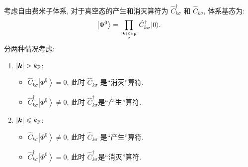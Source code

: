 \begin{example}
考虑自由费米子体系, 对于真空态的产生和消灭算符为 $\hat{C}_{k \sigma}^{\dagger}$ 和 $\hat{C}^{}_{k \sigma}$, 体系基态为:
\begin{equation}
\left|\Phi^{0}\right\rangle=\prod_{|\boldsymbol{k}|\leqslant k_{\mathrm{F}}\atop \sigma} \hat{C}_{k \sigma}^{\dagger}|0\rangle.
\end{equation}
分两种情况考虑:
\begin{enumerate}
\item $|\vct{k}|>k_{\fun F}$:
\begin{itemize}
\item $\hat{C}_{k \sigma}\left|\Phi^{0}\right\rangle=0$, 此时 $\hat{C}_{k \sigma}$ 是“消灭”算符.
\item $\hat{C}_{k \sigma}^{\dagger}\left|\Phi^{0}\right\rangle \neq 0$, 此时 $\hat{C}_{k \sigma}^{\dagger}$是“产生”算符.
\end{itemize}
\item $|\boldsymbol{k}|\leqslant k_{\mathrm{F}}$:
\begin{itemize}
\item $\hat{C}_{k \sigma}\left|\Phi^{0}\right\rangle \neq 0$, 此时 $\hat{C}_{k \sigma}$ 是“产生”算符.
\item $\hat{C}_{k \sigma}^{\dagger}\left|\Phi^{0}\right\rangle=0$, 此时 $\hat{C}_{k \sigma}^{\dagger}$是“消灭”算符.
\end{itemize}
\end{enumerate}
\end{example}

